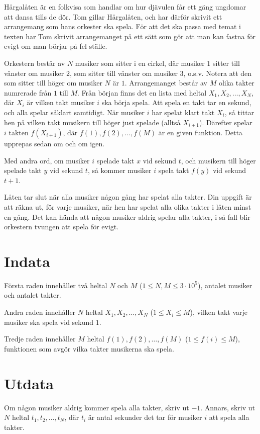 \noindent

Hårgalåten är en folkvisa som handlar om hur djävulen får ett gäng ungdomar att dansa
tills de dör. Tom gillar Hårgalåten, och har därför skrivit ett arrangemang som hans
orkester ska spela. För att det ska passa med temat i texten har Tom skrivit 
arrangemanget på ett sätt som gör att man kan fastna för evigt om man börjar på fel ställe.

Orkestern består av $N$ musiker som sitter i en cirkel, där musiker $1$ sitter till vänster om 
musiker $2$, som sitter till vänster om musiker $3$, o.s.v. Notera att den som sitter 
till höger om musiker $N$ är $1$. Arrangemanget består av $M$ olika takter numrerade från $1$ till $M$. 
Från början finns det en lista med heltal $X_1, X_2, \dots, X_N$,
där $X_i$ är vilken takt musiker $i$ ska börja spela. Att spela en takt tar en sekund, och alla
spelar såklart samtidigt. När musiker $i$ har spelat klart takt $X_i$, så tittar hen på vilken 
takt musikern till höger just spelade (alltså $X_{i+1}$). Därefter spelar $i$ takten $f(X_{i+1})$,
där $f(1), f(2), \dots, f(M)$ är en given funktion. Detta upprepas sedan om och om igen.

Med andra ord, om musiker $i$ spelade takt $x$ vid sekund $t$, och musikern till höger spelade takt
$y$ vid sekund $t$, så kommer musiker $i$ spela takt $f(y)$ vid sekund $t+1$. 

Låten tar slut när alla musiker någon gång har spelat alla takter. Din uppgift är att räkna 
ut, för varje musiker, när hen har spelat alla olika takter i låten minst en gång. Det kan hända 
att någon musiker aldrig spelar alla takter, i så fall blir orkestern tvungen att spela för evigt.

\section*{Indata}
Första raden innehåller två heltal $N$ och $M$ ($1 \leq N,M \leq 3 \cdot 10^5$), antalet 
musiker och antalet takter.

Andra raden innehåller $N$ heltal $X_1, X_2, \dots, X_N$ ($1 \leq X_i \leq M$), vilken takt varje musiker ska 
spela vid sekund $1$.

Tredje raden innehåller $M$ heltal $f(1), f(2), \dots, f(M)$ ($1 \leq f(i) \leq M$), funktionen som 
avgör vilka takter musikerna ska spela.

\section*{Utdata}
Om någon musiker aldrig kommer spela alla takter, skriv ut $-1$.
Annars, skriv ut $N$ heltal $t_1, t_2, \dots, t_N$, där $t_i$ är antal sekunder det tar för musiker $i$ att spela alla takter.

